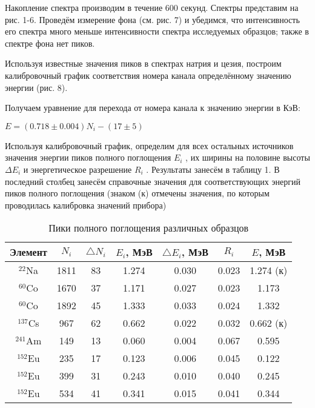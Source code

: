 Накопление спектра производим в течение 600 секунд. Спектры представим на рис.
1-6. Проведём измерение фона (см. рис. 7) и убедимся, что интенсивность его
спектра много меньше интенсивности спектра исследуемых образцов; также в спектре
фона нет пиков.

Используя известные значения пиков в спектрах натрия и цезия, построим
калибровочный график соответствия номера канала определённому значению энергии
(рис. 8).

Получаем уравнение для перехода от номера канала к значению энергии в КэВ:
\begin{center}
    $E = (0.718 \pm 0.004)N_i - (17 \pm 5)$
\end{center}

Используя калибровочный график, определим для всех остальных источников значения
энергии пиков полного поглощения $E_i$ , их ширины на половине высоты $\Delta
E_i$ и энергетическое разрешение $R_i$ . Результаты занесём в таблицу 1. В
последний столбец занесём справочные значения для соответствующих энергий пиков
полного поглощения (знаком (к) отмечены значения, по которым проводилась
калибровка значений прибора)

\begin{table}[h]
  \centering
  \begin{center}
  \caption{Пики полного поглощения различных образцов}
  \end{center}
  \label{tab:my_label}
  \begin{tabular}{| c | c | c | c | c | c | c |}
    \hline
    Элемент & $N_i$ & $\triangle N_i$ & $E_i$, МэВ & $\triangle E_i$, МэВ &
    $R_i$ & $E$, МэВ \\
    \hline
    $^{22}$Na & 1811 & 83 & 1.274 & 0.030 & 0.023 & 1.274 (к) \\
    \hline
    $^{60}$Co & 1670 & 37 & 1.171 & 0.027 & 0.023  & 1.173 \\
    \hline
    $^{60}$Co & 1892 & 45 & 1.333 & 0.033 & 0.024 & 1.332 \\
    \hline
    $^{137}$Cs & 967 & 62 & 0.662 & 0.022 & 0.032 & 0.662 (к) \\
    \hline
    $^{241}$Am & 149 & 13 & 0.060 & 0.004 & 0.067 & 0.595 \\
    \hline
    $^{152}$Eu & 235 & 17 & 0.123 & 0.006 & 0.045 & 0.122 \\
    \hline
    $^{152}$Eu & 399 & 31 & 0.243 & 0.010 & 0.040 & 0.245 \\
    \hline
    $^{152}$Eu & 534 & 41 & 0.341 & 0.015 & 0.041 & 0.344 \\
    \hline
  \end{tabular}
\end{table}

